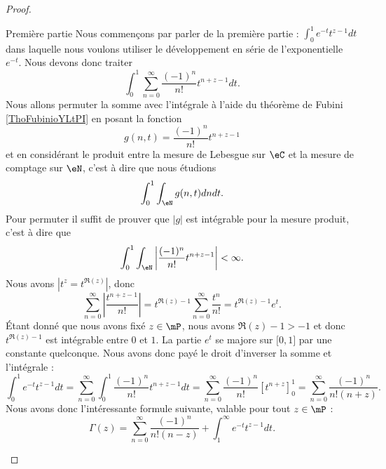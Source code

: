 \begin{proof}
\begin{subproof}
        \item[Première partie] Nous commençons par parler de la première partie : \( \int_0^1 e^{-t}t^{z-1}dt\) dans laquelle nous voulons utiliser le développement en série de l'exponentielle \(  e^{-t}\). Nous devons donc traiter
            \begin{equation}
                \int_0^1\sum_{n=0}^{\infty}\frac{ (-1)^n }{ n! }t^{n+z-1}dt.
            \end{equation}
            Nous allons permuter la somme avec l'intégrale à l'aide du théorème de Fubini \ref{ThoFubinioYLtPI} en posant la fonction
            \begin{equation}
                g(n,t)=\frac{ (-1)^n }{ n! }t^{n+z-1}
            \end{equation}
            et en considérant le produit entre la mesure de Lebesgue sur \( \eC\) et la mesure de comptage sur \( \eN\), c'est à dire que nous étudions
            \begin{equation}
                \int_0^1\int_{\eN}g(n,t)dndt.
            \end{equation}
            Pour permuter il suffit de prouver que \( | g |\) est intégrable pour la mesure produit, c'est à dire que
            \begin{equation}
                \int_0^1\int_{\eN}\left| \frac{ (-1)^n }{ n! }t^{n+z-1} \right| <\infty.
            \end{equation}
            Nous avons \( | t^z=t^{\Re(z)} |\), donc
            \begin{equation}
                \sum_{n=0}^{\infty}\left| \frac{ t^{n+z-1} }{ n! } \right| =t^{\Re(z)-1}\sum_{n=0}^{\infty}\frac{ t^n }{ n! }=t^{\Re(z)-1} e^{t}.
            \end{equation}
            Étant donné que nous avons fixé \( z\in\mP\), nous avons \( \Re(z)-1>-1\) et donc \( t^{\Re(z)-1}\) est intégrable entre \( 0\) et \( 1\).
            La partie \(  e^{t}\) se majore sur \( \mathopen[ 0 , 1 \mathclose]\) par une constante quelconque. Nous avons donc payé le droit d'inverser la somme et l'intégrale :
            \begin{equation}
                \int_0^1 e^{-t}t^{z-1}dt=\sum_{n=0}^{\infty}\int_0^1\frac{ (-1)^n }{ n! }t^{n+z-1}dt=\sum_{n=0}^{\infty}\frac{ (-1)^n }{ n! }[t^{n+z}]_0^1=\sum_{n=0}^{\infty}\frac{ (-1)^n }{ n!(n+z) }.
            \end{equation}
            Nous avons donc l'intéressante formule suivante, valable pour tout \( z\in\mP\) :
            \begin{equation}
                \Gamma(z)=\sum_{n=0}^{\infty}\frac{ (-1)^n }{ n!(n-z) }+\int_1^{\infty} e^{-t}t^{z-1}dt.
            \end{equation}
            

\end{subproof}
\end{proof}
